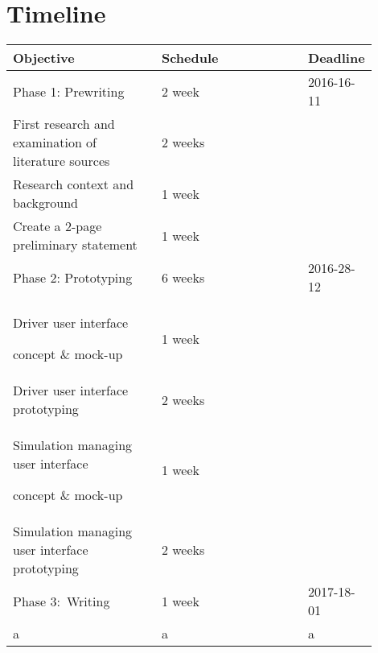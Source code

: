 \documentclass[hidelinks]{sig-alternate}
\begin{document}
\section{Timeline}
\vspace{3mm}
\noindent
\def\arraystretch{1.0}
\begin{tabular}{p{0.45\linewidth} | p{0.45\linewidth}}
Objective & Schedule & Deadline\\\hline
Phase 1: Prewriting
 & 2 week & 2016-16-11 \\\hline
First research and examination of literature sources
 & 2 weeks &  \\\hline
Research context and background & 1 week &  \\\hline
Create a 2-page preliminary statement  & 1 week &  \\\hline
Phase 2: Prototyping & 6 weeks & 2016-28-12  \\\hline
Driver user interface 

concept \& mock-up& 1 week &  \\\hline
Driver user interface prototyping & 2 weeks&  \\\hline
Simulation
managing user interface 

concept \& mock-up & 1 week&  \\\hline
Simulation
managing user interface prototyping & 2 weeks &  \\\hline
Phase 3:\  Writing & 1 week & 2017-18-01 \\\hline
a & a & a \\\hline
\end{tabular}
\vspace{3mm}




\end{document}
